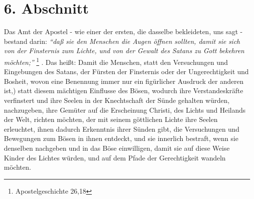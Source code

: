 \section{6. Abschnitt}  \label{kap2_ab6}

Das Amt der Apostel - wie einer der ersten, die dasselbe bekleideten, uns sagt -
bestand darin:
\textit{"`daß sie den Menschen die Augen öffnen sollten, damit sie
sich von der Finsternis zum Lichte, und von der Gewalt des Satans zu Gott
bekehren
möchten;"'}
\footnote{Apostelgeschichte 26,18}
.
Das heißt: Damit die Menschen, statt den 
Versuchungen und Eingebungen des Satans,  der Fürsten der
Finsternis oder der Ungerechtigkeit und Bosheit, wovon eine Benennung immer nur
ein figürlicher Ausdruck der anderen ist,) statt diesem mächtigen Einflusse des
Bösen, wodurch ihre Verstandeskräfte verfinstert und ihre Seelen in der
Knechtschaft der Sünde gehalten würden, nachzugeben, ihre Gemüter auf die
Erscheinung Christi, des Lichts und Heilands der Welt, richten möchten, der
mit seinem göttlichen Lichte ihre Seelen erleuchtet, ihnen dadurch Erkenntnis
ihrer Sünden gibt, die Versuchungen und Bewegungen zum Bösen in ihnen entdeckt,
und sie innerlich bestraft, wenn sie denselben nachgeben und in das Böse
einwilligen, damit sie auf diese Weise Kinder des Lichtes würden, und auf dem
Pfade der Gerechtigkeit wandeln möchten.

\medskip 


